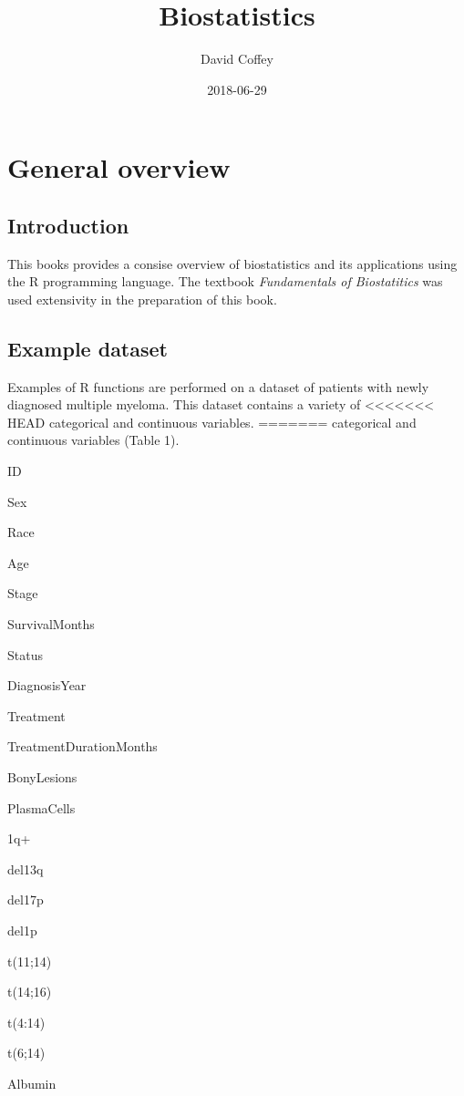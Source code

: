\documentclass[]{book}
\title{Biostatistics}
\author{David Coffey}
\date{2018-06-29}
\theoremstyle{definition}
\theoremstyle{definition}
\theoremstyle{definition}
\theoremstyle{remark}
\begin{document}
\maketitle

{
\setcounter{tocdepth}{1}
\tableofcontents
}
\chapter{General overview}\label{general-overview}

\section{Introduction}\label{introduction}

This books provides a consise overview of biostatistics and its
applications using the R programming language. The textbook
\emph{Fundamentals of Biostatitics} \citep{Rosner2016} was used
extensivity in the preparation of this book.

\section{Example dataset}\label{example-dataset}

Examples of R functions are performed on a dataset of patients with
newly diagnosed multiple myeloma. This dataset contains a variety of
<<<<<<< HEAD
categorical and continuous variables.
=======
categorical and continuous variables (Table 1).

ID

Sex

Race

Age

Stage

SurvivalMonths

Status

DiagnosisYear

Treatment

TreatmentDurationMonths

BonyLesions

PlasmaCells

1q+

del13q

del17p

del1p

t(11;14)

t(14;16)

t(4:14)

t(6;14)

Albumin
\end{document}
